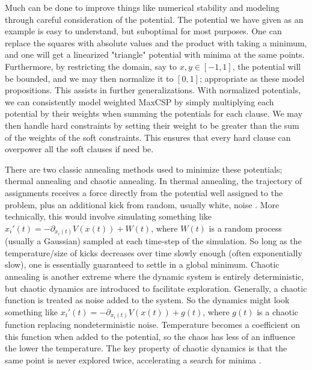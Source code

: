 Much can be done to improve things like numerical stability and modeling through careful consideration of the potential. The potential we have given as an example is easy to understand, but suboptimal for most purposes. One can replace the squares with absolute values and the product with taking a minimum, and one will get a linearized "triangle" potential with minima at the same points. Furthermore, by restricting the domain, say to $x, y \in [-1, 1]$, the potential will be bounded, and we may then normalize it to $[0, 1]$; appropriate as these model propositions. This assists in further generalizations. With normalized potentials, we can consistently model weighted MaxCSP by simply multiplying each potential by their weights when summing the potentials for each clause. We may then handle hard constraints by setting their weight to be greater than the sum of the weights of the soft constraints. This ensures that every hard clause can overpower all the soft clauses if need be.

There are two classic annealing methods used to minimize these potentials; thermal annealing and chaotic annealing. In thermal annealing, the trajectory of assignments receives a force directly from the potential well assigned to the problem, plus an additional kick from random, usually white, noise \citep{kirkpatrick1983optimization}. More technically, this would involve simulating something like $x_i'(t) = -\partial_{x_i(t)} V(x(t)) + W(t)$, where $W(t)$ is a random process (usually a Gaussian) sampled at each time-step of the simulation. So long as the temperature/size of kicks decreases over time slowly enough (often exponentially slow), one is essentially guaranteed to settle in a global minimum. Chaotic annealing is another extreme where the dynamic system is entirely deterministic, but chaotic dynamics are introduced to facilitate exploration. Generally, a chaotic function is treated as noise added to the system. So the dynamics might look something like $x_i'(t) = -\partial_{x_i(t)} V(x(t)) + g(t)$, where $g(t)$ is a chaotic function replacing nondeterministic noise. Temperature becomes a coefficient on this function when added to the potential, so the chaos has less of an influence the lower the temperature. The key property of chaotic dynamics is that the same point is never explored twice, accelerating a search for minima \citep{zhou1997chaotic}.

